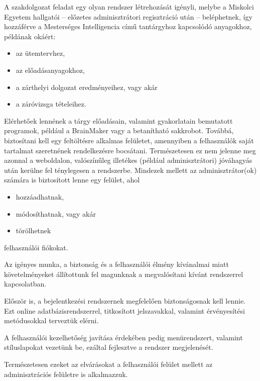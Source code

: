 

A szakdolgozat feladat egy olyan rendszer létrehozását igényli, melybe a Miskolci Egyetem hallgatói – előzetes adminisztrátori regisztráció után – beléphetnek, így hozzáférve a Mesterséges Intelligencia című tantárgyhoz kapcsolódó anyagokhoz, példának okáért:

\begin{itemize}
\item az ütemtervhez,
\item az előadásanyagokhoz,
\item a zárthelyi dolgozat eredményeihez, vagy akár
\item a záróvizsga tételeihez.
\end{itemize}

Elérhetőek lennének a tárgy előadásain, valamint gyakorlatain bemutatott programok, például a BrainMaker vagy a betanítható sakkrobot. Továbbá, biztosítani kell egy feltöltésre alkalmas felületet, amennyiben a felhasználók saját tartalmat szeretnének rendelkezésre bocsátani. Természetesen ez nem jelenne meg azonnal a weboldalon, valószínűleg illetékes (például adminisztrátori) jóváhagyás után kerülne fel ténylegesen a rendszerbe. Mindezek mellett az adminisztrátor(ok) számára is biztosított lenne egy felület, ahol
\begin{itemize}
\item hozzáadhatnak,
\item módosíthatnak, vagy akár
\item törölhetnek
\end{itemize}felhasználói fiókokat.



Az igényes munka, a biztonság és a felhasználói élmény kívánalmai miatt követelményeket állítottunk fel magunknak a megvalósítani kívánt rendszerrel kapcsolatban.

Először is, a bejelentkezési rendszernek megfelelően biztonságosnak kell lennie. Ezt online adatbázisrendszerrel, titkosított jelszavakkal, valamint érvényesítési metódusokkal terveztük elérni.

A felhasználói kezelhetőség javítása érdekében pedig menürendszert, valamint stíluslapokat vezetünk be, ezáltal fejlesztve a rendszer megjelenését.

Természetesen ezeket az elvárásokat a felhasználói felület mellett az adminisztrációs felületre is alkalmazzuk.
